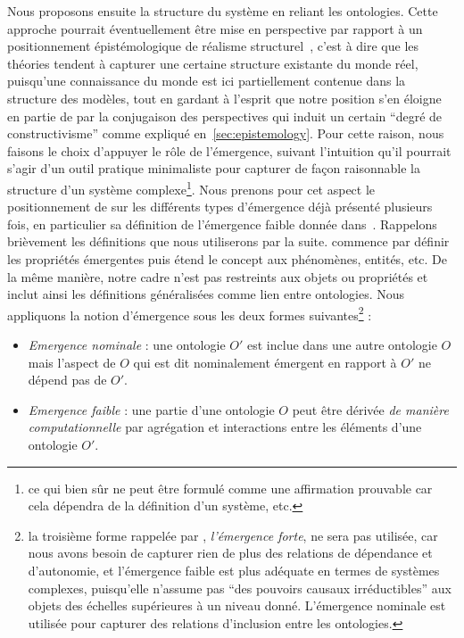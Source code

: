 {Nous proposons ensuite la structure du système en reliant les ontologies. Cette approche pourrait éventuellement être mise en perspective par rapport à un positionnement épistémologique de réalisme structurel~\cite{frigg2011everything}, c'est à dire que les théories tendent à capturer une certaine structure existante du monde réel, puisqu'une connaissance du monde est ici partiellement contenue dans la structure des modèles, tout en gardant à l'esprit que notre position s'en éloigne en partie de par la conjugaison des perspectives qui induit un certain ``degré de constructivisme'' comme expliqué en~\ref{sec:epistemology}. Pour cette raison, nous faisons le choix d'appuyer le rôle de l'émergence, suivant l'intuition qu'il pourrait s'agir d'un outil pratique minimaliste pour capturer de façon raisonnable la structure d'un système complexe\footnote{ce qui bien sûr ne peut être formulé comme une affirmation prouvable car cela dépendra de la définition d'un système, etc.}. Nous prenons pour cet aspect le positionnement de  sur les différents types d'émergence déjà présenté plusieurs fois, en particulier sa définition de l'émergence faible donnée dans~\cite{bedau2002downward}. Rappelons brièvement les définitions que nous utiliserons par la suite.  commence par définir les propriétés émergentes puis étend le concept aux phénomènes, entités, etc. De la même manière, notre cadre n'est pas restreints aux objets ou propriétés et inclut ainsi les définitions généralisées comme lien entre ontologies. Nous appliquons la notion d'émergence sous les deux formes suivantes\footnote{la troisième forme rappelée par , \emph{l'émergence forte}, ne sera pas utilisée, car nous avons besoin de capturer rien de plus des relations de dépendance et d'autonomie, et l'émergence faible est plus adéquate en termes de systèmes complexes, puisqu'elle n'assume pas ``des pouvoirs causaux irréductibles'' aux objets des échelles supérieures à un niveau donné. L'émergence nominale est utilisée pour capturer des relations d'inclusion entre les ontologies.} :
\begin{itemize}
\item \emph{Emergence nominale} : une ontologie $O'$ est inclue dans une autre ontologie $O$ mais l'aspect de $O$ qui est dit nominalement émergent en rapport à $O'$ ne dépend pas de $O'$.
\item \emph{Emergence faible} : une partie d'une ontologie $O$ peut être dérivée \emph{de manière computationnelle} par agrégation et interactions entre les éléments d'une ontologie $O'$.
\end{itemize}
}


